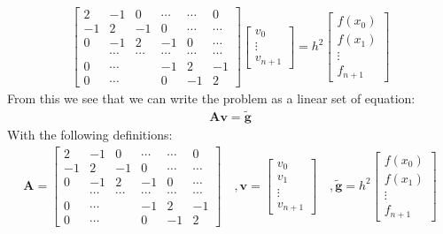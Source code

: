 \documentclass[american,a4paper,12pt]{article}
\renewcommand{\vec}[1]{\mathbf{#1}} %
\begin{document}
  \begin{align*}
        \begin{bmatrix}
          2 & -1 & 0 & \cdots & \cdots & 0 \\
          -1 & 2 & -1 & 0 & \cdots & \cdots \\
          0 & -1 & 2 & -1 & 0 & \cdots \\
           & \cdots & \cdots & \cdots & \cdots & \cdots \\
          0 & \cdots & & -1 & 2 & -1 \\
          0 & \cdots & & 0 & -1 & 2
        \end{bmatrix}
        \begin{bmatrix}
          v_0 \\
          \vdots \\
          v_{n+1}
        \end{bmatrix}
  = h^2
        \begin{bmatrix}
          f(x_0) \\
          f(x_1) \\
          \vdots \\
          f_{n+1}
        \end{bmatrix}
  \end{align*}
  From this we see that we can write the problem as a linear set of equation:
  \begin{align*}
    \vec{A}\vec{v} = \vec{\tilde{g}}
  \end{align*}
  With the following definitions:
  \begin{align*}
    \vec{A} =
    \begin{bmatrix}
      2 & -1 & 0 & \cdots & \cdots & 0 \\
      -1 & 2 & -1 & 0 & \cdots & \cdots \\
      0 & -1 & 2 & -1 & 0 & \cdots \\
       & \cdots & \cdots & \cdots & \cdots & \cdots \\
      0 & \cdots & & -1 & 2 & -1 \\
      0 & \cdots & & 0 & -1 & 2
    \end{bmatrix}
    \quad, \vec{v} =
    \begin{bmatrix}
      v_0 \\
      v_1 \\
      \vdots \\
      v_{n+1}
    \end{bmatrix}
    \quad, \vec{\tilde{g}} = h^2
    \begin{bmatrix}
      f(x_0) \\
      f(x_1) \\
      \vdots \\
      f_{n+1}
    \end{bmatrix}
  \end{align*}
\end{document}

